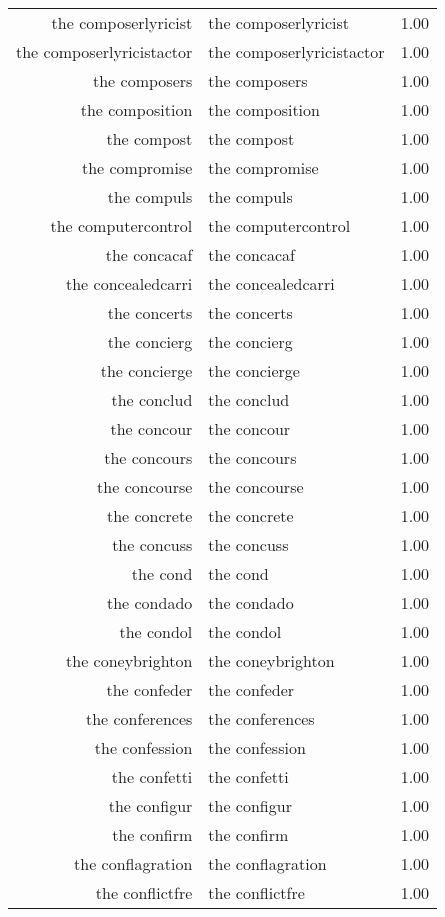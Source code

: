 \begin{table}[ht]
\begin{tabular}{rlr}
  the composerlyricist & the composerlyricist & 1.00 \\ 
  the composerlyricistactor & the composerlyricistactor & 1.00 \\ 
  the composers & the composers & 1.00 \\ 
  the composition & the composition & 1.00 \\ 
  the compost & the compost & 1.00 \\ 
  the compromise & the compromise & 1.00 \\ 
  the compuls & the compuls & 1.00 \\ 
  the computercontrol & the computercontrol & 1.00 \\ 
  the concacaf & the concacaf & 1.00 \\ 
  the concealedcarri & the concealedcarri & 1.00 \\ 
  the concerts & the concerts & 1.00 \\ 
  the concierg & the concierg & 1.00 \\ 
  the concierge & the concierge & 1.00 \\ 
  the conclud & the conclud & 1.00 \\ 
  the concour & the concour & 1.00 \\ 
  the concours & the concours & 1.00 \\ 
  the concourse & the concourse & 1.00 \\ 
  the concrete & the concrete & 1.00 \\ 
  the concuss & the concuss & 1.00 \\ 
  the cond & the cond & 1.00 \\ 
  the condado & the condado & 1.00 \\ 
  the condol & the condol & 1.00 \\ 
  the coneybrighton & the coneybrighton & 1.00 \\ 
  the confeder & the confeder & 1.00 \\ 
  the conferences & the conferences & 1.00 \\ 
  the confession & the confession & 1.00 \\ 
  the confetti & the confetti & 1.00 \\ 
  the configur & the configur & 1.00 \\ 
  the confirm & the confirm & 1.00 \\ 
  the conflagration & the conflagration & 1.00 \\ 
  the conflictfre & the conflictfre & 1.00 \\ 

\end{tabular}
\end{table}
